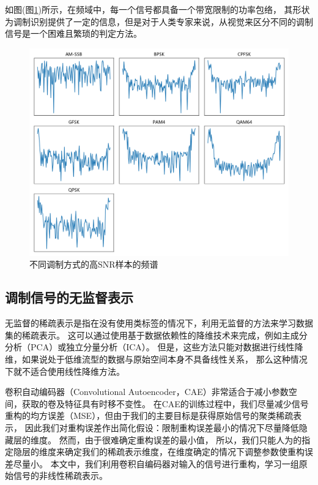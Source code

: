 如图(图\ref{sec:fig_3_3})所示，在频域中，每一个信号都具备一个带宽限制的功率包络，
其形状为调制识别提供了一定的信息，但是对于人类专家来说，从视觉来区分不同的调制信号是一个困难且繁琐的判定方法。\par
\begin{figure}[!h]
	\centering
	\includegraphics[scale=0.45]{figures/chapter_3/fig_3_3}
	\caption{不同调制方式的高SNR样本的频谱}\label{sec:fig_3_3}
\end{figure}

\subsection{调制信号的无监督表示}

无监督的稀疏表示是指在没有使用类标签的情况下，利用无监督的方法来学习数据集的稀疏表示。
这可以通过使用基于数据依赖性的降维技术来完成，例如主成分分析（PCA）或独立分量分析（ICA）。
但是，这些方法只能对数据进行线性降维，如果说处于低维流型的数据与原始空间本身不具备线性关系，
那么这种情况下就不适合使用线性降维方法。\par

卷积自动编码器（Convolutional Autoencoder，CAE）非常适合于减小参数空间，获取的卷及特征具有时移不变性。
在CAE的训练过程中，我们尽量减少信号重构的均方误差（MSE），但由于我们的主要目标是获得原始信号的聚类稀疏表示，
因此我们对重构误差作出简化假设：限制重构误差最小的情况下尽量降低隐藏层的维度。
然而，由于很难确定重构误差的最小值，
所以，我们只能人为的指定隐层的维度来确定我们的稀疏表示维度，在维度确定的情况下调整参数使重构误差尽量小。
本文中，我们利用卷积自编码器对输入的信号进行重构，学习一组原始信号的非线性稀疏表示。\par

